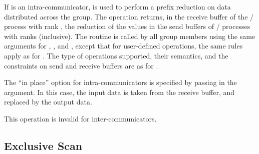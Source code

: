 If  is an intra-communicator,
 is used to perform a prefix reduction
on data distributed across the group.
The operation returns, in the receive buffer of the \MPI/ process with rank
, the
reduction of the values in the send buffers of \MPI/ processes with ranks
 (inclusive).  The routine is called by all
group members using the same arguments for , ,
 and ,
except that for user-defined operations, the same rules apply as for
. The type of operations supported, their semantics,
and the constraints on send and receive buffers are as for
.

The ``in place'' option  for intra-communicators is specified by passing
in the  argument.  In this case, the input data is
taken from the receive buffer, and replaced by the output data.

This operation is invalid for inter-communicators.

\subsection{Exclusive Scan}
\label{subsec:coll-exscan}
\label{coll-exscan} %

